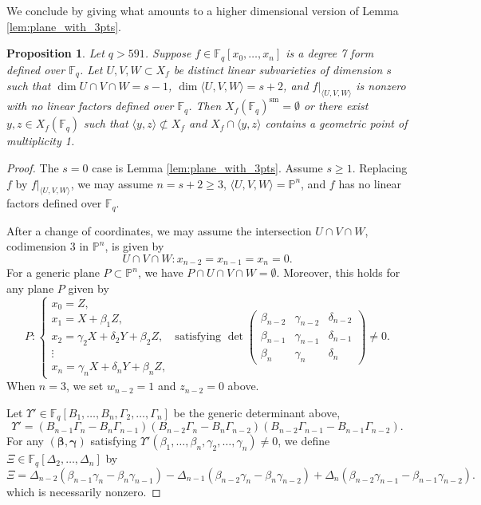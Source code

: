 \documentclass{amsart}
\newcommand{\F}{\mathbb{F}}
\renewcommand{\P}{\mathbb{P}}
\newcommand{\Span}[1]{\langle #1 \rangle}
\newcommand{\sm}{\mathrm{sm}}
\renewcommand{\v}{\beta}
\newcommand{\w}{\gamma}
\newcommand{\z}{\delta}
\newcommand{\vvar}{B}
\newcommand{\wvar}{\Gamma}
\newcommand{\zvar}{\Delta}
\newcommand{\bv}{\boldsymbol{\v}}
\newcommand{\bw}{\boldsymbol{\w}}
\newtheorem{proposition}[theorem]{Proposition}
\theoremstyle{definition}
\numberwithin{equation}{section}
\numberwithin{table}{section}
\newcommand{\qbound}[1]{{\color{cyan}$q > {#1}$}}
\renewcommand{\qbound}[1]{{$q > {#1}$}}
\begin{document}
We conclude by giving what amounts to a higher dimensional version of Lemma \ref{lem:plane_with_3pts}.

\begin{proposition}
\label{prop:codim3bert_d=7}
    Let \qbound{591}. Suppose $f \in \F_q[x_0,\ldots,x_n]$ is a degree 7 form defined over $\F_q$. Let $U, V, W \subset X_f$ be distinct linear subvarieties of dimension $s$ such that $\dim U \cap V \cap W = s-1$, $\dim \Span{U,V,W} = s+2$, and $f|_{\Span{U,V,W}}$ is nonzero with no linear factors defined over $\F_q$. Then $X_f(\F_q)^\sm = \emptyset$ or there exist $y,z \in X_f(\F_q)$ such that $\Span{y,z} \not\subset X_f$ and $X_f \cap \Span{y,z}$ contains a geometric point of multiplicity 1.
\end{proposition}

\begin{proof}
    The $s=0$ case is Lemma \ref{lem:plane_with_3pts}. Assume $s \geq 1$. Replacing $f$ by $f|_{\Span{U,V,W}}$, we may assume $n=s+2 \geq 3$, $\Span{U,V,W} = \P^n$, and $f$ has no linear factors defined over $\F_q$. 
    
    After a change of coordinates, we may assume the intersection $U \cap V \cap W$, codimension 3 in $\P^n$, is given by
    \[U \cap V \cap W \colon x_{n-2} = x_{n-1} = x_n = 0.\]
    For a generic plane $P \subset \P^n$, we have $P \cap U \cap V \cap W = \emptyset$. Moreover, this holds for any plane $P$ given by
    \[P \colon \begin{cases}
        x_0 = Z, \\
        x_1 = X +\v_1Z, \\
        x_2 =\w_2X + \z_2Y +\v_2Z, \\
        \vdots \\
        x_n =\w_nX + \z_nY +\v_nZ,
    \end{cases} \text{ satisfying } \det \begin{pmatrix}
		\v_{n-2} &\w_{n-2} &\z_{n-2} \\
		\v_{n-1} &\w_{n-1} &\z_{n-1} \\
		\v_{n} &\w_{n} &\z_{n} 
	\end{pmatrix} \neq 0.\]
    When $n=3$, we set $w_{n-2}=1$ and $z_{n-2}=0$ above. 

    Let $\Upsilon' \in \F_q[\vvar_1,\ldots,\vvar_n,\wvar_2,\ldots,\wvar_n]$ be the generic determinant above,
    \begin{equation}
    \label{eq:precond_v,w}
    \Upsilon' = (\vvar_{n-1}\wvar_n - \vvar_n\wvar_{n-1})(\vvar_{n-2}\wvar_n - \vvar_n\wvar_{n-2})(\vvar_{n-2}\wvar_{n-1} - \vvar_{n-1}\wvar_{n-2}).
    \end{equation}
    For any $(\bv,\bw)$ satisfying $\Upsilon'(\v_1,\ldots,\v_n,\w_2,\ldots,\w_n) \neq 0$, we define $\Xi \in \F_q[\zvar_2,\ldots,\zvar_n]$ by
    \[\Xi = \zvar_{n-2}(\v_{n-1}\w_n -\v_n\w_{n-1}) - \zvar_{n-1}(\v_{n-2}\w_n -\v_n\w_{n-2}) + \zvar_n(\v_{n-2}\w_{n-1} -\v_{n-1}\w_{n-2}).\]
    which is necessarily nonzero.


\end{proof}
\end{document}
